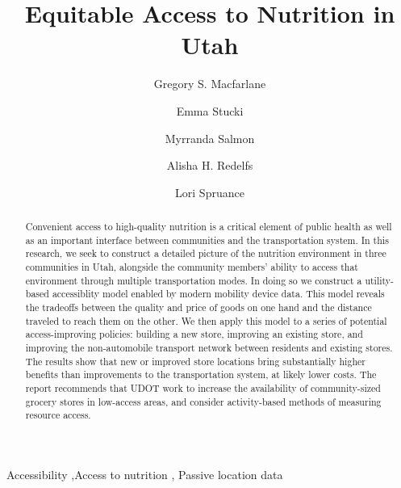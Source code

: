 \documentclass[
  letterpaper,
  authoryear,
  review,
  3p]{elsarticle}
\begin{document}
\begin{frontmatter}
\title{Equitable Access to Nutrition in Utah}
\author[1]{Gregory S. Macfarlane%
%
}
\author[]{Emma Stucki%
%
}

\author[]{Myrranda Salmon%
%
}

\author[]{Alisha H. Redelfs%
%
}

\author[]{Lori Spruance%
%
}








        
\begin{abstract}
Convenient access to high-quality nutrition is a critical element of
public health as well as an important interface between communities and
the transportation system. In this research, we seek to construct a
detailed picture of the nutrition environment in three communities in
Utah, alongside the community members' ability to access that
environment through multiple transportation modes. In doing so we
construct a utility-based accessiblity model enabled by modern mobility
device data. This model reveals the tradeoffs between the quality and
price of goods on one hand and the distance traveled to reach them on
the other. We then apply this model to a series of potential
access-improving policies: building a new store, improving an existing
store, and improving the non-automobile transport network between
residents and existing stores. The results show that new or improved
store locations bring substantially higher benefits than improvements to
the transportation system, at likely lower costs. The report recommends
that UDOT work to increase the availability of community-sized grocery
stores in low-access areas, and consider activity-based methods of
measuring resource access.
\end{abstract}





\begin{keyword}
    Accessibility \sep Access to nutrition \sep 
    Passive location data
\end{keyword}
\end{frontmatter}
    \ifdefined\Shaded\renewenvironment{Shaded}{\begin{tcolorbox}[breakable, boxrule=0pt, interior hidden, sharp corners, frame hidden, borderline west={3pt}{0pt}{shadecolor}, enhanced]}{\end{tcolorbox}}\fi
\end{document}
